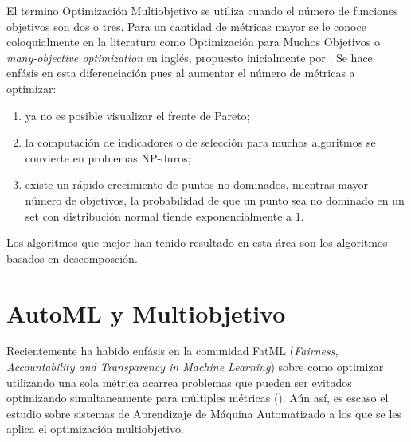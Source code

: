  El termino Optimizaci\'on Multiobjetivo se utiliza cuando el n\'umero de funciones objetivos son dos o tres. Para un cantidad de m\'etricas mayor se le conoce coloquialmente en la literatura como Optimizaci\'on para Muchos Objetivos o \textit{many-objective optimization} en ingl\'es, propuesto inicialmente por \cite{10.1007/978-3-540-31880-4_2}. Se hace enf\'asis en esta diferenciaci\'on pues al aumentar el n\'umero de m\'etricas a optimizar:
 \begin{enumerate}
     \item ya no es posible visualizar el frente de Pareto;
     \item la computaci\'on de indicadores o de selecci\'on para muchos algoritmos se convierte en problemas NP-duros;
     \item existe un r\'apido crecimiento de puntos no dominados, mientras mayor n\'umero de objetivos, la probabilidad de que un punto sea no dominado en un set con distribuci\'on normal tiende exponencialmente a 1.
 \end{enumerate}

Los algoritmos que mejor han tenido resultado en esta \'area son los algoritmos basados en descomposci\'on.


\section{AutoML y Multiobjetivo}\label{proposal:mooautoml}

Recientemente ha habido enf\'asis en la comunidad FatML (\textit{Fairness, Accountability and Transparency in Machine Learning}) sobre como optimizar utilizando una sola m\'etrica acarrea problemas que pueden ser evitados optimizando simultaneamente para m\'ultiples m\'etricas (\cite{barocas2017fairness}). A\'un as\'i, es escaso el estudio sobre sistemas de Aprendizaje de M\'aquina Automatizado a los que se les aplica el optimizaci\'on multiobjetivo.

